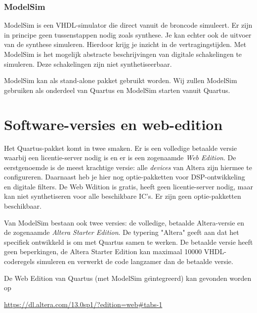 \documentclass[a4paper,12pt,fleqn,twoside]{book}
\begin{document}
\subsubsection{ModelSim}
ModelSim is een VHDL-simulator die direct vanuit de broncode simuleert. Er zijn
in principe geen tussenstappen nodig zoals synthese. Je kan echter ook de
uitvoer van de synthese simuleren. Hierdoor krijg je inzicht in de
vertragingstijden. Met ModelSim is het mogelijk abstracte beschrijvingen van
digitale schakelingen te simuleren. Deze schakelingen zijn niet
synthetiseerbaar.

ModelSim kan als stand-alone pakket gebruikt worden. Wij zullen ModelSim
gebruiken als onderdeel van Quartus en ModelSim starten vanuit Quartus.


\section{Software-versies en web-edition}
\label{sec:softwareversies}
Het Quartus-pakket komt in twee smaken. Er is een volledige betaalde versie
waarbij een licentie-server nodig is en er is een zogenaamde \textsl{Web
Edition}. De
eerstgenoemde is de meest krachtige versie: alle \textsl{devices} van Altera
zijn hiermee te configureren. Daarnaast heb je hier nog optie-pakketten voor
DSP-ontwikkeling en digitale filters. De Web Wdition is gratis, heeft geen 
licentie-server nodig, maar kan niet synthetiseren voor alle beschikbare IC's.
Er zijn geen optie-pakketten beschikbaar.

Van ModelSim bestaan ook twee versies: de volledige, betaalde Altera-versie en
de zogenaamde \textsl{Altera Starter Edition}. De typering "Altera" geeft aan
dat het specifiek ontwikkeld is om met Quartus samen te werken. De betaalde
versie heeft geen beperkingen, de Altera Starter Edition kan maximaal 10000
VHDL-coderegels simuleren en verwerkt de code langzamer dan de betaalde versie.

De Web Edition van Quartus (met ModelSim ge\"{\i}ntegreerd) kan gevonden
worden op

\hspace*{1cm}\url{https://dl.altera.com/13.0sp1/?edition=web#tabs-1}

%
\end{document}
